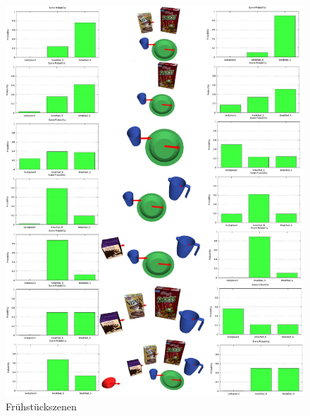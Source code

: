 \begin{figure}
	\centering
	\includegraphics[width=14cm]{bilder/evaluationfruehstueckszenen.pdf}
	\caption{Fr{\"u}hst{\"u}ckszenen \cite{gassner17}}
	\label{img:fruehstueck}
\end{figure}
